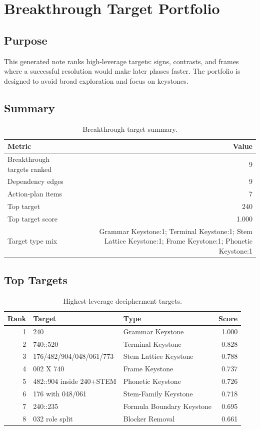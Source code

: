 \section{Breakthrough Target Portfolio}

\subsection{Purpose}

This generated note ranks high-leverage targets: signs, contrasts, and frames where a successful resolution would make later phases faster. The portfolio is designed to avoid broad exploration and focus on keystones.

\subsection{Summary}

\begin{table}[htbp]
\centering
\begin{tabular}{p{}r}
\toprule
\textbf{Metric} & \textbf{Value} \\
\midrule
Breakthrough targets ranked & 9 \\
Dependency edges & 9 \\
Action-plan items & 7 \\
Top target & 240 \\
Top target score & 1.000 \\
Target type mix & Grammar Keystone:1; Terminal Keystone:1; Stem Lattice Keystone:1; Frame Keystone:1; Phonetic Keystone:1 \\
\bottomrule
\end{tabular}
\caption{Breakthrough target summary.}
\end{table}

\subsection{Top Targets}

\begin{table}[htbp]
\centering
\footnotesize
\begin{tabular}{rp{}p{}r}
\toprule
\textbf{Rank} & \textbf{Target} & \textbf{Type} & \textbf{Score} \\
\midrule
1 & 240 & Grammar Keystone & 1.000 \\
2 & 740::520 & Terminal Keystone & 0.828 \\
3 & 176/482/904/048/061/773 & Stem Lattice Keystone & 0.788 \\
4 & 002 X 740 & Frame Keystone & 0.737 \\
5 & 482::904 inside 240+STEM & Phonetic Keystone & 0.726 \\
6 & 176 with 048/061 & Stem-Family Keystone & 0.718 \\
7 & 240::235 & Formula Boundary Keystone & 0.695 \\
8 & 032 role split & Blocker Removal & 0.661 \\
\bottomrule
\end{tabular}
\caption{Highest-leverage decipherment targets.}
\end{table}

